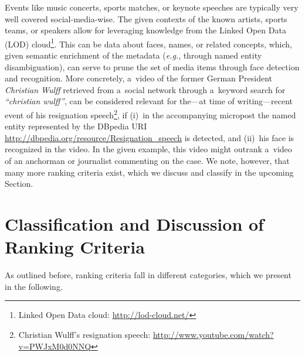 \documentclass[runningheads,a4paper,11pt]{llncs}
\begin{document}
Events like music concerts, sports matches, or keynote speeches
are typically very well covered social-media-wise.
The given contexts of the known artists, sports teams, or speakers
allow for leveraging knowledge from the
Linked Open Data (LOD) cloud\footnote{Linked Open Data cloud: \url{http://lod-cloud.net/}}.
This can be data about faces, names, or related concepts,
which, given semantic enrichment of the metadata
(\emph{e.g.}, through named entity disambiguation),
can serve to prune the set of media items
through face detection and recognition.
More concretely, a~video of the former German President \emph{Christian Wulff}
retrieved from a~social network through a~keyword search for \emph{``christian wulff''},
can be considered relevant for the---at time of writing---recent
event of his resignation speech\footnote{Christian Wulff's resignation speech:
\url{http://www.youtube.com/watch?v=PWJxM0d0NNQ}},
if (i)~in the accompanying micropost the named entity represented by the DBpedia URI
\url{http://dbpedia.org/resource/Resignation_speech} is detected,
and (ii)~his face is recognized in the video.
In the given example, this video might outrank a~video
of an anchorman or journalist commenting on the case.
We note, however, that many more ranking criteria exist,
which we discuss and classify in the upcoming Section.

\section{Classification and Discussion of Ranking Criteria}
As outlined before, ranking criteria fall in different categories,
which we present in the following.
\end{document}
